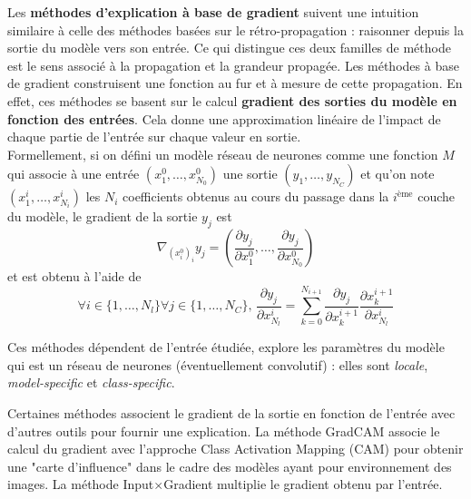 \documentclass{report}
\begin{document}
        Les \textbf{méthodes d'explication à base de gradient} \cite{ancona_gradient-based_2019} suivent une intuition similaire à celle des méthodes basées sur le rétro-propagation : raisonner depuis la sortie du modèle vers son entrée. Ce qui distingue ces deux familles de méthode est le sens associé à la propagation et la grandeur propagée. Les méthodes à base de gradient construisent une fonction au fur et à mesure de cette propagation. En effet, ces méthodes se basent sur le calcul \textbf{gradient des sorties du modèle en fonction des entrées}. Cela donne une approximation linéaire de l'impact de chaque partie de l'entrée sur chaque valeur en sortie.\\
        Formellement, si on défini un modèle réseau de neurones comme une fonction $M$ qui associe à une entrée $(x^0_1,\dots,x^0_{N_0})$ une sortie $(y_1,\dots,y_{N_C})$ et qu'on note $(x^i_1,\dots,x^i_{N_i})$ les $N_i$ coefficients obtenus au cours du passage dans la $i^\text{ème}$ couche du modèle, le gradient de la sortie $y_j$ est 
        $$\nabla_{(x^0_i)_i}y_j = \left( \frac{\partial y_j}{\partial x^0_1}, \dots, \frac{\partial y_j}{\partial x^0_{N_0}} \right)$$
        et est obtenu à l'aide de  
        $$\forall i \in \{1,\dots, N_l\} \forall j \in \{1,\dots, N_C\}, \, \frac{\partial y_j}{\partial x^i_{N_l}} = \sum_{k=0}^{N_{i+1}} \frac{\partial y_j}{\partial x^{i+1}_{k}} \frac{\partial x^{i+1}_{k}}{\partial x^i_{N_l}}$$
        
        Ces méthodes dépendent de l'entrée étudiée, explore les paramètres du modèle qui est un réseau de neurones (éventuellement convolutif) : elles sont \emph{locale}, \emph{model-specific} et \emph{class-specific}.
        
        Certaines méthodes associent le gradient de la sortie en fonction de l'entrée avec d'autres outils pour fournir une explication. La méthode GradCAM \cite{selvaraju_grad-cam_2017} associe le calcul du gradient avec l'approche Class Activation Mapping (CAM) pour obtenir une "carte d'influence" dans le cadre des modèles ayant pour environnement des images. La méthode Input$\times$Gradient \cite{shrikumar_not_2017} multiplie le gradient obtenu par l'entrée. 
        
\end{document}
